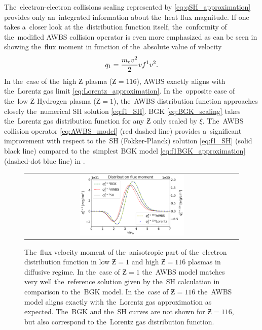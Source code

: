 The~electron-electron collisions scaling 
\cite{Epperlein_PoFB1991} represented by 
\eqref{eq:qSH_approximation} provides only an~integrated information about
the~heat flux magnitude. If one takes a~closer look at the~distribution
function itself, the~conformity of the~modified AWBS collision operator
is even more emphasized as can be seen in  showing
the~flux moment in function of the~absolute value of velocity
\begin{equation}
  q_1 = \frac{m_ev^2}{2}v f^1 v^2 .
  \label{eq:q1}
\end{equation}
In the~case of the~high $\Zbar$ plasma ($\Zbar = 116$), 
AWBS exactly aligns with the~Lorentz gas limit \eqref{eq:Lorentz_approximation}.
In the~opposite case of the~low
$\Zbar$ Hydrogen plasma ($\Zbar = 1$), the~AWBS distribution function 
approaches closely the~numerical SH solution \eqref{eq:f1_SH}. 
BGK \eqref{eq:BGK_scaling} takes 
the~Lorentz gas distribution function for any $\Zbar$ 
only scaled by $\xi$.  
The~AWBS collision operator \eqref{eq:AWBS_model} (red dashed line) 
provides 
a~significant improvement with respect to the~SH (Fokker-Planck) solution
\eqref{eq:f1_SH} (solid black line) compared to the~simplest BGK model 
\eqref{eq:f1BGK_approximation} (dashed-dot blue line) 
in .

\begin{figure}[tbh]
  \begin{center}
    \begin{tabular}{c}
      \includegraphics[width=0.5\textwidth]{q1s.png}
    \end{tabular}
  \caption{  
  The~flux velocity moment of the~anisotropic part of the~electron distribution 
  function in low $\Zbar=1$ and high $\Zbar=116$ plasmas in diffusive regime. 
  In the~case of $\Zbar = 1$ the~AWBS model matches very well 
  the~reference solution given by the~SH calculation \cite{SpitzerHarm_PR1953} 
  in comparison to the~BGK model. In the~case of $\Zbar = 116$ the~AWBS model
  aligns exactly with the~Lorentz gas approximation as expected. 
  The~BGK and the~SH curves are not shown for $\Zbar = 116$, but also 
  correspond to the~Lorentz gas distribution function.
  }
  \label{fig:q1s_summary}
  \end{center} 
\end{figure}

